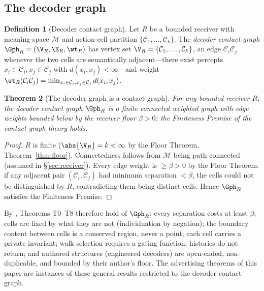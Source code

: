 \documentclass[twocolumn,11pt,a4paper]{article}
\theoremstyle{adv}
\newtheorem{theorem}{Theorem}[section]
\theoremstyle{definition}
\newtheorem{definition}[theorem]{Definition}
\theoremstyle{remark}
\newcommand{\Cell}{\mathcal{C}}        %
\newcommand{\Recv}{R}                  %
\newcommand{\floor}{\beta}            %
\newcommand{\Mean}{\mathcal{M}}        %
\newcommand{\dist}{d}
\begin{document}
\subsection{The decoder graph}

\begin{definition}[Decoder contact graph]
\label{def:decoder-contact}
Let $\Recv$ be a bounded receiver with meaning-space $\Mean$ and action-cell
partition $\{\Cell_1,\dots,\Cell_k\}$. The \emph{decoder contact graph}
$\Gph_\Recv=(\V_\Recv,\E_\Recv,\wt_\Recv)$ has vertex set
$\V_\Recv=\{\Cell_1,\dots,\Cell_k\}$, an edge $\Cell_i\Cell_j$ whenever the
two cells are semantically adjacent---there exist percepts $x_i\in\Cell_i,
x_j\in\Cell_j$ with $\dist(x_i,x_j)<\infty$---and weight
$\wt_\Recv(\Cell_i\Cell_j)=\min_{x_i\in\Cell_i,x_j\in\Cell_j}\dist(x_i,x_j)$.
\end{definition}

\begin{theorem}[The decoder graph is a contact graph]
\label{thm:decoder-contact}
For any bounded receiver $\Recv$, the decoder contact graph $\Gph_\Recv$ is a
finite connected weighted graph with edge weights bounded below by the receiver
floor $\floor>0$: the Finiteness Premise of the contact-graph theory holds.
\end{theorem}

\begin{proof}
$\Recv$ is finite ($\abs{\V_\Recv}=k<\infty$ by the Floor Theorem,
Theorem~\ref{thm:floor}). Connectedness follows from $\Mean$ being path-connected
(assumed in \S\ref{sec:receiver}). Every edge weight is $\ge\floor>0$ by the
Floor Theorem: if any adjacent pair $(\Cell_i,\Cell_j)$ had minimum separation
$<\floor$, the cells could not be distinguished by $\Recv$, contradicting
them being distinct cells. Hence $\Gph_\Recv$ satisfies the Finiteness Premise.
\end{proof}

By \citet{sachikonye2025contact}, Theorems T0--T8 therefore hold of $\Gph_\Recv$:
every separation costs at least $\floor$; cells are fixed by what they are not
(individuation by negation); the boundary content between cells is a conserved
region, never a point; each cell carries a private invariant; walk selection
requires a gating function; histories do not return; and authored structures
(engineered decoders) are open-ended, non-duplicable, and bounded by their
author's floor. The advertising theorems of this paper are instances of these
general results restricted to the decoder contact graph.
\end{document}
